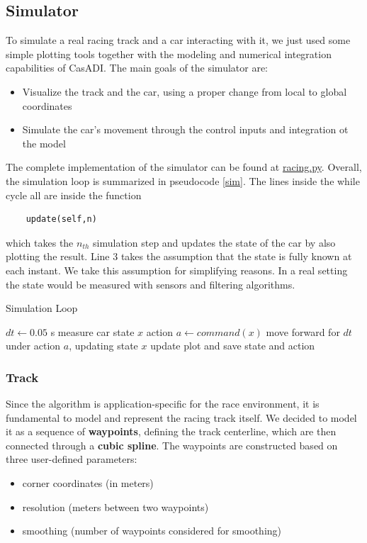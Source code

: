 \documentclass[a4paper, onecolumn, 12pt]{article}
\begin{document}
\subsection{Simulator}

To simulate a real racing track and a car interacting with it, we just used
some simple plotting tools together with the modeling and numerical integration
capabilities of CasADI. The main goals of the simulator are:
\begin{itemize}
    \item Visualize the track and the car, using a proper change from local to global coordinates
    \item Simulate the car's movement through the control inputs and integration ot the model
\end{itemize}
The complete implementation of the simulator can be found at
\href{https://github.com/neverorfrog/vehicle-control/blob/main/simulation/racing.py}{racing.py}.
Overall, the simulation loop is summarized in pseudocode \ref{sim}. The lines
inside the while cycle all are inside the function 
\begin{verbatim}
    update(self,n) 
\end{verbatim}
which takes the $n_{th}$ simulation step and updates the state of the car by
also plotting the result. Line 3 takes the assumption that the state is fully
known at each instant. We take this assumption for simplifying reasons. In a
real setting the state would be measured with sensors and filtering algorithms. 

\begin{algorithm}[h]
    \caption{Simulation Loop}\label{sim}
    \begin{algorithmic}[1]
        \State $dt \gets 0.05$ s 
        \State measure car state $x$
        \State action $a \gets command(x)$ 
        \State move forward for $dt$ under action $a$, updating state $x$
        \State update plot and save state and action
        \EndWhile
    \end{algorithmic}
\end{algorithm}

\newpage
\subsubsection*{Track}
\label{subsec:track}

Since the algorithm is application-specific for the race environment, it is
fundamental to model and represent the racing track itself. We decided to model
it as a sequence of \textbf{waypoints}, defining the track centerline, which are
then connected through a \textbf{cubic spline}. The waypoints are constructed
based on three user-defined parameters:
\begin{itemize}
    \item corner coordinates (in meters)
    \item resolution (meters between two waypoints)
    \item smoothing (number of waypoints considered for smoothing)
\end{itemize}
\end{document}
